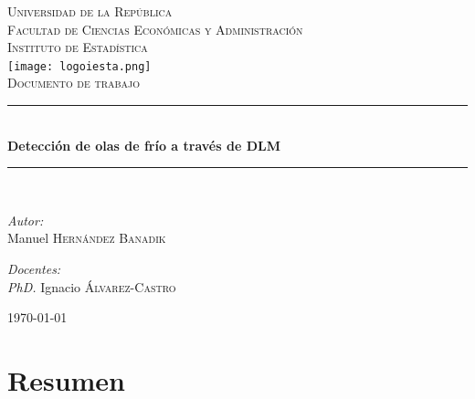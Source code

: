 \documentclass{article}\usepackage[]{graphicx}\usepackage[]{color}
\newcommand{\HRule}{\rule{\linewidth}{0.5mm}}
\begin{document}
\begin{titlepage}
\begin{center}



\vspace*{\fill}
\textsc{\LARGE Universidad de la República}\\[1.5cm]

\textsc{\Large Facultad de Ciencias Económicas y Administración}\\[1.5cm]

\textsc{\large Instituto de Estadística}\\[1.5cm]

\texttt{[image: logoiesta.png]}~\\[1cm]

\textsc{\large Documento de trabajo}\\[0.5cm]


\HRule \\[0.4cm]
{\Large \bfseries Detección de olas de frío a través de DLM }

\HRule \\[1.5cm]

\begin{minipage}{0.4\textwidth}
\begin{flushleft}
\emph{Autor:}\\
Manuel \textsc{Hernández Banadik}
\\
\end{flushleft}
\end{minipage}
\begin{minipage}{0.4\textwidth}
\begin{flushright}
\emph{Docentes:} \\
\textit{PhD.} Ignacio \textsc{Álvarez-Castro}
\end{flushright}
\end{minipage}

\vfill

{\large \today}

\end{center}
\end{titlepage}\pagebreak


\tableofcontents
\listoffigures
\listoftables

\section{Resumen}
\end{document}
